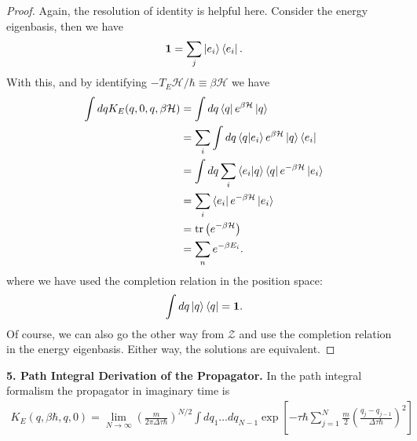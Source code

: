 \documentclass{book}
\theoremstyle{definition}
\newcommand{\nn}{\nonumber}
\newcommand{\had}{\mathcal{H}}
\newcommand{\f}[2]{\frac{#1}{#2}}
\newcommand{\lp}{\left(}
\newcommand{\rp}{\right)}
\newcommand{\lb}{\left[}
\newcommand{\rb}{\right]}
\begin{document}
\begin{proof}
	Again, the resolution of identity is helpful here. Consider the energy eigenbasis, then we have
	\begin{align}
	\bm{1} = \sum_j  \ket{e_i}\bra{e_i}.
	\end{align}
	With this, and by identifying $-T_E\had/\hbar \equiv \beta\had$ we have
	\begin{align}
	\int dq K_E(q,0,q,\beta\had) &= \int dq \bra{q} e^{\beta \had} \ket{q} \nn\\
	&= \sum_i \int dq \bra{q}\ket{e_i} e^{\beta \had} \ket{q}\bra{e_i} \nn\\
	&= \int dq \sum_i \braket{e_i}{q} \bra{q}e^{-\beta\had}\ket{e_i}\nn\\
	&= \sum_i \bra{e_i} e^{-\beta \had} \ket{e_i}\nn\\
	&= \tr\lp e^{-\beta\had} \rp\nn\\
	&= \sum_n e^{-\beta E_i}.
	\end{align}
	where we have used the completion relation in the position space: 
	$$\int dq \ket{q}\bra{q} = \bm{1}.$$
	Of course, we can also go the other way from $\mathcal{Z}$ and use the completion relation in the energy eigenbasis. Either way, the solutions are equivalent.  
\end{proof}




\noindent \textbf{5. Path Integral Derivation of the Propagator.} In the path integral formalism the propagator in imaginary time is 
\begin{align}
K_E(q,\beta \hbar, q,0) = \lim_{N\to \infty} \lp \f{m}{2\pi \Delta \tau \hbar} \rp^{N/2}\int dq_1\dots dq_{N-1}\exp\lb -\tau \hbar \sum^N_{j=1} \f{m}{2} \lp \f{q_j - q_{j-1}}{\Delta \tau \hbar} \rp^2 \rb
\end{align}
\end{document}
